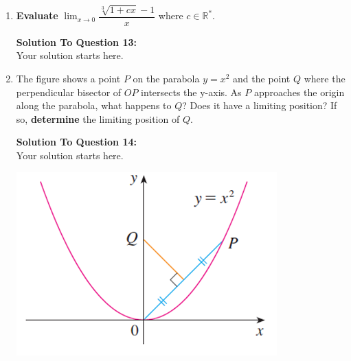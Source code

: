 \documentclass[12pt]{book}
\begin{document}
\begin{enumerate}
\newpage

\item \textbf{Evaluate} $\lim_{x\to 0}\limits \dfrac{\sqrt[3]{1+cx}-1}{x}$ where $c \in \mathbb{R^*}$.

\vspace{0.3cm} 
\textbf{Solution To Question 13:}\\
 Your solution starts here.
\vspace{0.3cm}

\newpage


\item The figure shows a point $P$ on the parabola $y=x^2$ and the point $Q$ where the perpendicular bisector of $OP$ intersects the y-axis. As $P$ approaches the origin along the parabola, what happens to $Q$? Does it have a limiting position? If so, \textbf{determine} the limiting position of $Q$. 

\vspace{0.3cm} 
\textbf{Solution To Question 14:}\\
 Your solution starts here.
\vspace{0.3cm}


\newpage
\vspace{4cm}
\includegraphics[width=\linewidth]{parabola.png}


\newpage



\end{enumerate}
\end{document}
